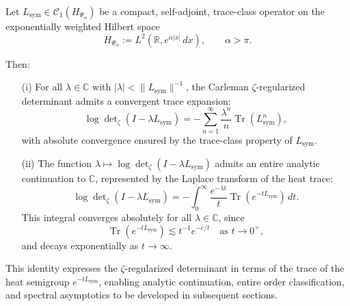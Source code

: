 \begin{lemma}
\label{lem:det_via_heat_trace}
Let \( L_{\mathrm{sym}} \in \mathcal{C}_1(H_{\Psi_\alpha}) \) be a compact, self-adjoint, trace-class operator on the exponentially weighted Hilbert space
\[
H_{\Psi_\alpha} := L^2(\mathbb{R}, e^{\alpha|x|} \, dx), \qquad \alpha > \pi.
\]

Then:
\begin{enumerate}
  \item[\textnormal{(i)}] For all \( \lambda \in \mathbb{C} \) with \( |\lambda| < \|L_{\mathrm{sym}}\|^{-1} \), the Carleman \(\zeta\)-regularized determinant admits a convergent trace expansion:
  \[
  \log \det\nolimits_{\zeta}(I - \lambda L_{\mathrm{sym}})
  = - \sum_{n=1}^\infty \frac{\lambda^n}{n} \operatorname{Tr}(L_{\mathrm{sym}}^n),
  \]
  with absolute convergence ensured by the trace-class property of \( L_{\mathrm{sym}} \).

  \item[\textnormal{(ii)}] The function \( \lambda \mapsto \log \det\nolimits_\zeta(I - \lambda L_{\mathrm{sym}}) \) admits an entire analytic continuation to \( \mathbb{C} \), represented by the Laplace transform of the heat trace:
  \[
  \log \det\nolimits_\zeta(I - \lambda L_{\mathrm{sym}})
  = - \int_0^\infty \frac{e^{-\lambda t}}{t} \operatorname{Tr}(e^{-t L_{\mathrm{sym}}}) \, dt.
  \]
  This integral converges absolutely for all \( \lambda \in \mathbb{C} \), since
  \[
  \operatorname{Tr}(e^{-t L_{\mathrm{sym}}}) \lesssim t^{-1} e^{-c/t}
  \quad \text{as } t \to 0^+,
  \]
  and decays exponentially as \( t \to \infty \).
\end{enumerate}

\medskip
\noindent
This identity expresses the \(\zeta\)-regularized determinant in terms of the trace of the heat semigroup \( e^{-t L_{\mathrm{sym}}} \), enabling analytic continuation, entire order classification, and spectral asymptotics to be developed in subsequent sections.
\end{lemma}
% 